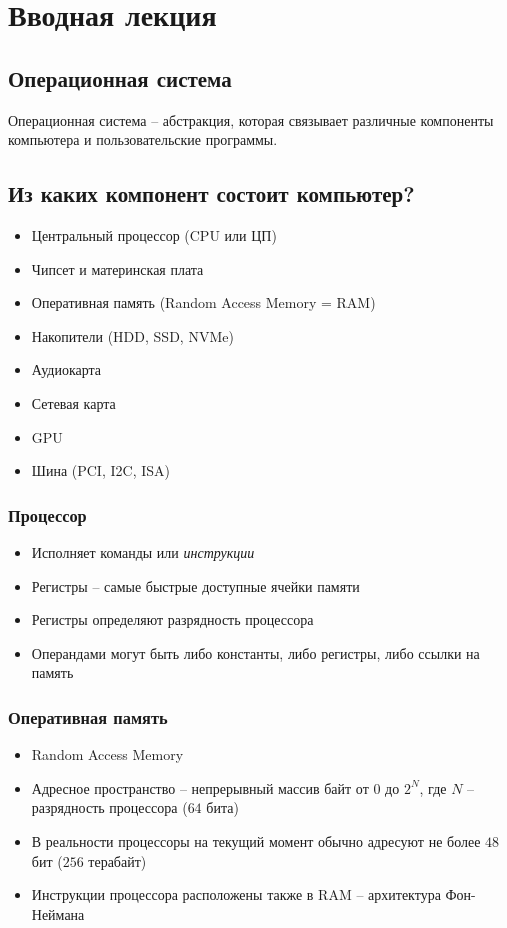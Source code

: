 \section{Вводная лекция}
  \subsection{Операционная система}
  Операционная система -- абстракция, которая связывает различные компоненты компьютера и пользовательские программы.
  
  \subsection{Из каких компонент состоит компьютер?}
  \begin{itemize}
    \item Центральный процессор (CPU или ЦП)
    \item Чипсет и материнская плата
    \item Оперативная память (Random Access Memory = RAM)
    \item Накопители (HDD, SSD, NVMe)
    \item Аудиокарта
    \item Сетевая карта
    \item GPU
    \item Шина (PCI, I2C, ISA)
  \end{itemize}
  
  \subsubsection{Процессор}
  \begin{itemize}
    \item Исполняет команды или \textit{инструкции}
    \item Регистры -- самые быстрые доступные ячейки памяти
    \item Регистры определяют разрядность процессора
    \item Операндами могут быть либо константы, либо регистры, либо ссылки на память
  \end{itemize}
  
  \subsubsection{Оперативная память}
  \begin{itemize}
    \item Random Access Memory
    \item Адресное пространство -- непрерывный массив байт от $0$ до $2^N$, где $N$ -- разрядность процессора ($64$ бита)
    \item В реальности процессоры на текущий момент обычно адресуют не более $48$ бит ($256$ терабайт)
    \item Инструкции процессора расположены также в RAM -- архитектура Фон-Неймана
  \end{itemize}
  

